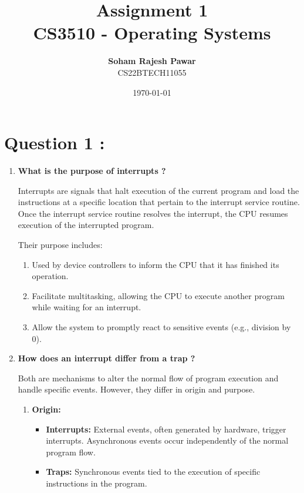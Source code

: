 \documentclass{article}
\begin{document}
\title{\textbf{Assignment 1}\\CS3510 - Operating Systems}
\author{\textbf{Soham Rajesh Pawar}\\ CS22BTECH11055}
\date{\today}

\maketitle

\section*{Question 1 :}

\begin{enumerate}[label=(\alph*)]
    \item \textbf{What is the purpose of interrupts ?}
    
    Interrupts are signals that halt execution of the current program and load the instructions at a specific location that pertain to the interrupt service routine. Once the interrupt service routine resolves the interrupt, the CPU resumes execution of the interrupted program.

    Their purpose includes:
    \begin{enumerate}[label=\roman*)]
        \item Used by device controllers to inform the CPU that it has finished its operation.
        \item Facilitate multitasking, allowing the CPU to execute another program while waiting for an interrupt.
        \item Allow the system to promptly react to sensitive events (e.g., division by 0).
    \end{enumerate}

    \item \textbf{How does an interrupt differ from a trap ?}
    
    Both are mechanisms to alter the normal flow of program execution and handle specific events. However, they differ in origin and purpose.
    \begin{enumerate}[label=\roman*)]
        \item \textbf{Origin:}
        \begin{itemize}
            \item \textbf{Interrupts:} External events, often generated by hardware, trigger interrupts. Asynchronous events occur independently of the normal program flow.
            \item \textbf{Traps:} Synchronous events tied to the execution of specific instructions in the program.
        \end{itemize}
        

\end{enumerate}
\end{enumerate}
\end{document}
